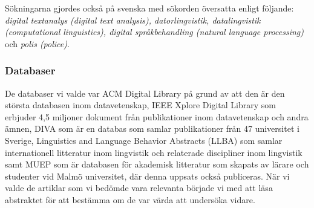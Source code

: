 \documentclass[swedish]{maucsthesis}
\begin{document}
Sökningarna gjordes också på svenska med sökorden översatta enligt följande: \textit
{digital textanalys (digital text analysis), datorlingvistik, datalingvistik
(computational linguistics), digital språkbehandling (natural language processing)} och
\textit {polis (police)}.

\subsubsection{Databaser}

De databaser vi valde var ACM Digital Library på grund av att den är den
största databasen inom datavetenskap, IEEE Xplore Digital Library som erbjuder
4,5 miljoner dokument från publikationer inom datavetenskap och andra ämnen,
DIVA som är en databas som samlar publikationer från 47 universitet i Sverige,
Linguistics and Language Behavior Abstracts (LLBA) som samlar internationell
litteratur inom lingvistik och relaterade discipliner inom lingvistik samt
MUEP som är databasen för akademisk litteratur som skapats av lärare och
studenter vid Malmö universitet, där denna uppsats också publiceras. När vi
valde de artiklar som vi bedömde vara relevanta började vi med att läsa abstraktet
för att bestämma om de var värda att undersöka vidare.
\end{document}
